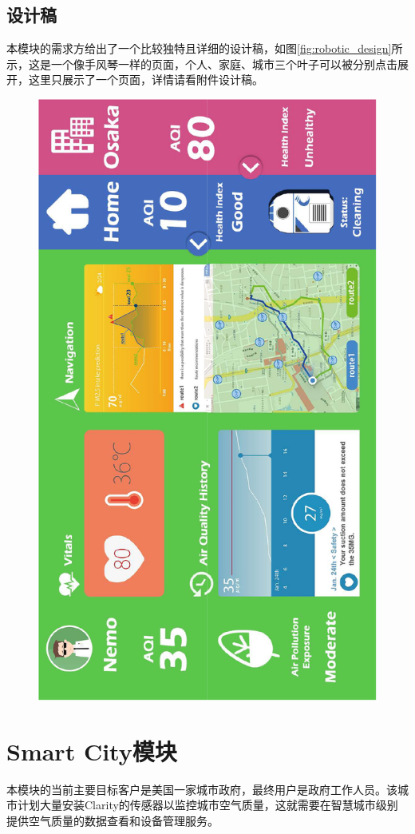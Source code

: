 \subsection{设计稿}
本模块的需求方给出了一个比较独特且详细的设计稿，如图\ref{fig:robotic_design}所示，这是一个像手风琴一样的页面，个人、家庭、城市三个叶子可以被分别点击展开，这里只展示了一个页面，详情请看附件设计稿。
\begin{figure}[H]
 \centering
 \includegraphics[height=0.8\linewidth, page=2, angle=-90]{pdf/robotic_design.pdf}
\end{figure}

\section{Smart City模块}
本模块的当前主要目标客户是美国一家城市政府，最终用户是政府工作人员。该城市计划大量安装Clarity的传感器以监控城市空气质量，这就需要在智慧城市级别提供空气质量的数据查看和设备管理服务。
